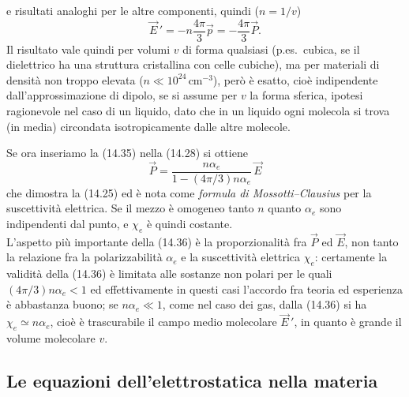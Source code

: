 e risultati analoghi per le altre componenti, quindi ($n=1/v$)
\begin{equation}
  \vec E\,'=-n\frac{4\pi}{3}\vec p=-\frac{4\pi}{3}\vec P.
  \tag{14.35}
\end{equation}
Il risultato vale quindi per volumi $v$ di forma qualsiasi (p.es.\ cubica, se il
dielettrico ha una struttura cristallina con celle cubiche), ma per materiali di
densit\`a non troppo elevata ($n\ll10^{24}\,\mathrm{cm}^{-3}$), per\`o \`e
esatto, cio\`e indipendente dall'approssimazione di dipolo, se si assume per $v$
la forma sferica, ipotesi ragionevole nel caso di un liquido, dato che in un
liquido ogni molecola si trova (in media) circondata isotropicamente dalle altre
molecole.

Se ora inseriamo la (14.35) nella (14.28) si ottiene
\begin{equation}
  \vec P=\frac{n\alpha_e}{1-(4\pi/3)n\alpha_e}\,\vec E
  \tag{14.36}
\end{equation}
che dimostra la (14.25) ed \`e nota come \textit{formula di Mossotti--Clausius}
per la suscettivit\`a elettrica. Se il mezzo \`e omogeneo tanto $n$ quanto
$\alpha_e$ sono indipendenti dal punto, e $\chi_e$ \`e quindi costante.\\
L'aspetto pi\`u importante della (14.36) \`e la proporzionalit\`a fra $\vec P$
ed $\vec E$, non tanto la relazione fra la polarizzabilit\`a $\alpha_e$ e la
suscettivit\`a elettrica $\chi_e$: certamente la validit\`a della (14.36) \`e
limitata alle sostanze non polari per le quali $(4\pi/3)n\alpha_e<1$ ed
effettivamente in questi casi l'accordo fra teoria ed esperienza \`e abbastanza
buono; se $n\alpha_e\ll1$, come nel caso dei gas, dalla (14.36) si ha
\ $\chi_e\simeq n\alpha_e$, cio\`e \`e trascurabile il campo medio molecolare
$\vec E\,'$, in quanto \`e grande il volume molecolare $v$.

\subsection{Le equazioni dell'elettrostatica nella materia}

